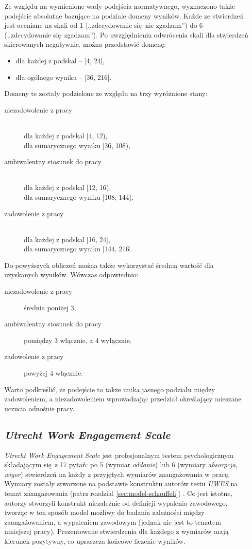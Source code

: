 Ze względu na wymienione wady podejścia normatywnego, wyznaczono także podejście absolutne bazujące na podziale domeny wyników. Każde ze stwierdzeń jest oceniane na skali od 1 (,,zdecydowanie się nie zgadzam'') do 6 (,,zdecydowanie się zgadzam''). Po uwzględnieniu odwrócenia skali dla stwierdzeń skierowanych negatywnie, można przedstawić domenę:
\begin{itemize}
\item dla każdej z podskal -- [4, 24],
\item dla ogólnego wyniku -- [36, 216].
\end{itemize}
Domeny te zostały podzielone ze względu na trzy wyróżnione stany:
\begin{description}
\item[niezadowolenie z pracy] \hfill \\
dla każdej z podskal [4, 12), \hfill \\ dla sumarycznego wyniku [36, 108),
\item[ambiwalentny stosunek do pracy] \hfill \\
dla każdej z podskal [12, 16), \hfill \\ dla sumarycznego wyniku [108, 144),
\item[zadowolenie z pracy] \hfill \\
dla każdej z podskal [16, 24], \hfill \\ dla sumarycznego wyniku [144, 216].
\end{description}

Do powyższych obliczeń można także wykorzystać średnią wartość dla uzyskanych wyników. Wówczas odpowiednio:
\begin{description}
\item[niezadowolenie z pracy] średnia poniżej 3,
\item[ambiwalentny stosunek do pracy] pomiędzy 3 włącznie, a 4 wyłącznie,
\item[zadowolenie z pracy] powyżej 4 włącznie.
\end{description}

Warto podkreślić, że podejście to także unika jasnego podziału między zadowoleniem, a niezadowoleniem wprowadzając przedział określający mieszane uczucia odnośnie pracy.

\subsection{\emph{Utrecht Work Engagement Scale}}
\label{sec:tests-eng}
\emph{Utrecht Work Engagement Scale} jest profesjonalnym testem psychologicznym składającym się z 17 pytań: po 5 (wymiar \textit{oddanie}) lub 6 (wymiary \textit{absorpcja}, \textit{wigor}) stwierdzeń na każdy z przyjętych wymiarów zaangażowania w pracę. Wymiary zostały stworzone na podstawie konstruktu autorów testu \emph{UWES} na temat zaangażowania (patrz rozdział \ref{sec:model-schauffeli}) \citep{schaufeli2001burnout}. Co jest istotne, autorzy stworzyli konstrukt niezależnie od definicji wypalenia zawodowego, tworząc w ten sposób model możliwy do
badania zależności między zaangażowaniem, a wypaleniem zawodowym (jednak nie jest to tematem niniejszej pracy). Prezentowane stwierdzenia dla każdego z wymiarów mają kierunek pozytywny, co upraszcza końcowe liczenie wyników.

